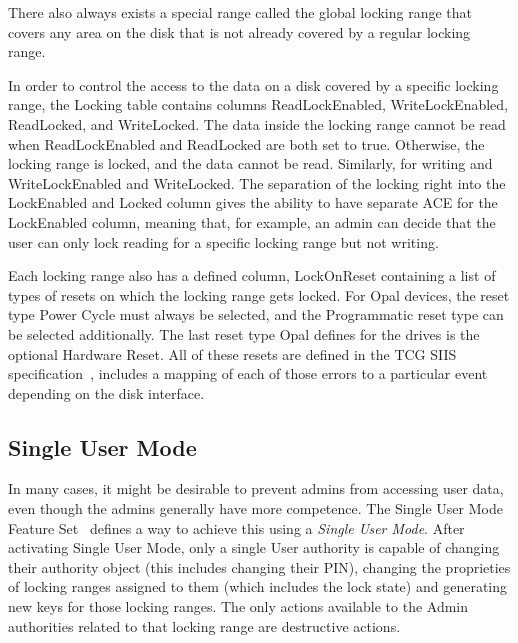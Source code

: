 There also always exists a special range called the global locking range that covers any area on the disk that is not already covered by a regular locking range.

In order to control the access to the data on a disk covered by a specific locking range, the Locking table contains columns ReadLockEnabled, WriteLockEnabled, ReadLocked, and WriteLocked. The data inside the locking range cannot be read when ReadLockEnabled and ReadLocked are both set to true. Otherwise, the locking range is locked, and the data cannot be read. Similarly, for writing and WriteLockEnabled and WriteLocked. The separation of the locking right into the LockEnabled and Locked column gives the ability to have separate ACE for the LockEnabled column, meaning that, for example, an admin can decide that the user can only lock reading for a specific locking range but not writing. 

Each locking range also has a defined column, LockOnReset containing a list of types of resets on which the locking range gets locked. 
For Opal devices, the reset type Power Cycle must always be selected, and the Programmatic reset type can be selected additionally. The last reset type Opal defines for the drives is the optional Hardware Reset. All of these resets are defined in the TCG SIIS specification~\cite{tcg-siis}, includes a mapping of each of those errors to a particular event depending on the disk interface.

\subsection{Single User Mode}

In many cases, it might be desirable to prevent admins from accessing user data, even though the admins generally have more competence. 
The Single User Mode Feature Set~\cite{tcg-sum} defines a way to achieve this using a \emph{Single User Mode}.
After activating Single User Mode, only a single User authority is capable of changing their authority object (this includes changing their PIN), changing the proprieties of locking ranges assigned to them (which includes the lock state) and generating new keys for those locking ranges.
The only actions available to the Admin authorities related to that locking range are destructive actions.

